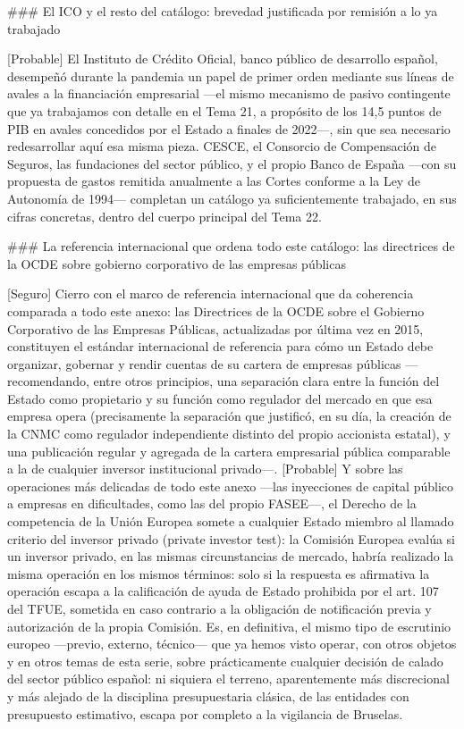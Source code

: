 \documentclass[10pt,a4paper]{article}
\newcounter{anexo}
\begin{document}
### El ICO y el resto del catálogo: brevedad justificada por remisión a lo ya trabajado

[Probable] El Instituto de Crédito Oficial, banco público de desarrollo español, desempeñó durante la pandemia un papel de primer orden mediante sus líneas de avales a la financiación empresarial —el mismo mecanismo de pasivo contingente que ya trabajamos con detalle en el Tema 21, a propósito de los 14,5 puntos de PIB en avales concedidos por el Estado a finales de 2022—, sin que sea necesario redesarrollar aquí esa misma pieza. CESCE, el Consorcio de Compensación de Seguros, las fundaciones del sector público, y el propio Banco de España —con su propuesta de gastos remitida anualmente a las Cortes conforme a la Ley de Autonomía de 1994— completan un catálogo ya suficientemente trabajado, en sus cifras concretas, dentro del cuerpo principal del Tema 22.

### La referencia internacional que ordena todo este catálogo: las directrices de la OCDE sobre gobierno corporativo de las empresas públicas

[Seguro] Cierro con el marco de referencia internacional que da coherencia comparada a todo este anexo: las Directrices de la OCDE sobre el Gobierno Corporativo de las Empresas Públicas, actualizadas por última vez en 2015, constituyen el estándar internacional de referencia para cómo un Estado debe organizar, gobernar y rendir cuentas de su cartera de empresas públicas —recomendando, entre otros principios, una separación clara entre la función del Estado como propietario y su función como regulador del mercado en que esa empresa opera (precisamente la separación que justificó, en su día, la creación de la CNMC como regulador independiente distinto del propio accionista estatal), y una publicación regular y agregada de la cartera empresarial pública comparable a la de cualquier inversor institucional privado—. [Probable] Y sobre las operaciones más delicadas de todo este anexo —las inyecciones de capital público a empresas en dificultades, como las del propio FASEE—, el Derecho de la competencia de la Unión Europea somete a cualquier Estado miembro al llamado criterio del inversor privado (private investor test): la Comisión Europea evalúa si un inversor privado, en las mismas circunstancias de mercado, habría realizado la misma operación en los mismos términos: solo si la respuesta es afirmativa la operación escapa a la calificación de ayuda de Estado prohibida por el art. 107 del TFUE, sometida en caso contrario a la obligación de notificación previa y autorización de la propia Comisión. Es, en definitiva, el mismo tipo de escrutinio europeo —previo, externo, técnico— que ya hemos visto operar, con otros objetos y en otros temas de esta serie, sobre prácticamente cualquier decisión de calado del sector público español: ni siquiera el terreno, aparentemente más discrecional y más alejado de la disciplina presupuestaria clásica, de las entidades con presupuesto estimativo, escapa por completo a la vigilancia de Bruselas.
\end{document}

